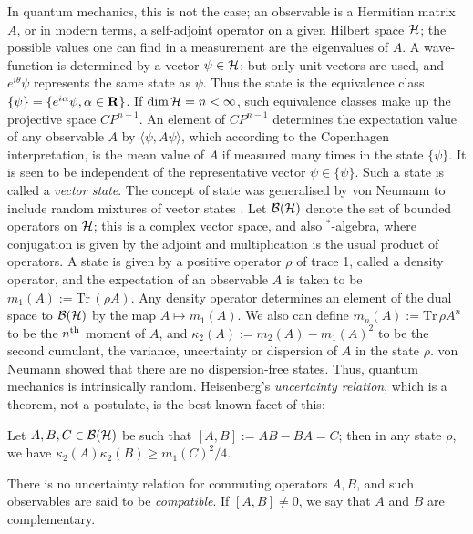 In quantum mechanics, this is not the case; an
observable is a Hermitian matrix $A$, or in modern terms, a self-adjoint
operator on a given Hilbert space ${\cal H}$; the possible values one can
find in a measurement are the eigenvalues of $A$.
A wave-function is determined by a vector $\psi\in{\cal H}$; but only
unit vectors are used, and $e^{i\theta}\psi$ represents the same state as
$\psi$. Thus the state is the equivalence class
$\{\psi\}=\{e^{i\alpha}\psi,\alpha\in{\bf R}\}$. If
$\dim{\cal H}=n<\infty$, such equivalence classes make up the
projective space $CP^{n-1}$. An element of $CP^{n-1}$ determines the
expectation value of any observable $A$ by $\langle\psi,A\psi\rangle$,
which according to the Copenhagen interpretation, is the mean value of $A$
if measured many times in the state $\{\psi\}$. It is seen to be
independent of the representative vector $\psi\in\{\psi\}$. Such a state is
called a {\em vector state}.
The concept of state was generalised by von Neumann to
include random mixtures of vector states . Let ${\cal B}({\cal H})$
denote the set of bounded operators on ${\cal H}$; this is a complex vector
space, and also $^*$-algebra, where conjugation is given by the adjoint
and multiplication is the usual product of operators.
A state is given by a positive operator
$\rho$ of trace 1, called a density operator,
and the expectation of an observable $A$
is taken to be $m_1(A):=\mbox{Tr}\,(\rho A)$. Any density operator
determines an element of the dual space to ${\cal B}({\cal H})$
by the map $A\mapsto m_1(A)$.
We also can define
$m_n(A):=\mbox{Tr}\,\rho A^n$ to be the $n^{\rm th}$ moment of $A$, and
$\kappa_2(A):=m_2(A)-m_1(A)^2$ to be the second cumulant, the variance,
uncertainty or dispersion of $A$ in the state $\rho$. 
von Neumann showed that there are no dispersion-free states.
Thus, quantum mechanics is intrinsically random.
Heisenberg's {\em uncertainty relation}, which is a theorem, not
a postulate, is the best-known facet of this:
\begin{theorem}
Let $A,B,C\in{\cal B}({\cal H})$ be such that $[A,B]:=AB-BA=C$; then in
any state $\rho$, we have $\kappa_2(A)\kappa_2(B)\geq m_1(C)^2/4$.
\end{theorem}
There is no uncertainty relation for commuting operators $A,B$, and
such observables are said to be
{\em compatible}. If $[A,B]\neq0$, we say that $A$ and $B$ are
complementary.

